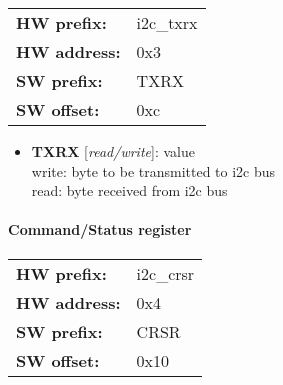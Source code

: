 \begin{tabular}{l l }
{\bf HW prefix:}  & i2c\_txrx\\
{\bf HW address:}  & 0x3\\
{\bf SW prefix:}  & TXRX\\
{\bf SW offset:}  & 0xc\\
\end{tabular}


\vspace{12pt}
\noindent
{}

\begin{itemize}
\item \begin{small}
{\bf 
TXRX
} [\emph{read/write}]: value
\\
write: byte to be transmitted to i2c bus \\                read: byte received from i2c bus
\end{small}
\end{itemize}
\paragraph*{Command/Status register}\vspace{12pt}

\begin{tabular}{l l }
{\bf HW prefix:}  & i2c\_crsr\\
{\bf HW address:}  & 0x4\\
{\bf SW prefix:}  & CRSR\\
{\bf SW offset:}  & 0x10\\
\end{tabular}


